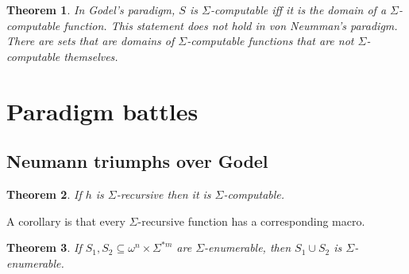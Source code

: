 \documentclass[a4paper, 12pt]{article}
\newtheorem{theorem}{Theorem}
\newtheorem{theorem}{Theorem}
\begin{document}
\begin{theorem}
    In Godel's paradigm, $S$ is $\Sigma$-computable iff it is the domain of a
    $\Sigma$-computable function. This statement \textit{does not hold} in von
    Neumman's paradigm. There are sets that are domains of $\Sigma$-computable
    functions that are not $\Sigma$-computable themselves.
\end{theorem}

\pagebreak 

\section{Paradigm battles}

\subsection{Neumann triumphs over Godel}

\begin{theorem}
    If $h$ is $\Sigma$-recursive then it is $\Sigma$-computable.
\end{theorem}

A corollary is that every $\Sigma$-recursive function has a corresponding macro.

\begin{theorem}
    If $S_1, S_2 \subseteq \omega^{n} \times \Sigma^{*m} $ are
    $\Sigma$-enumerable, then $S_1 \cup S_2$ is $\Sigma$-enumerable. 
\end{theorem}
\end{document}
